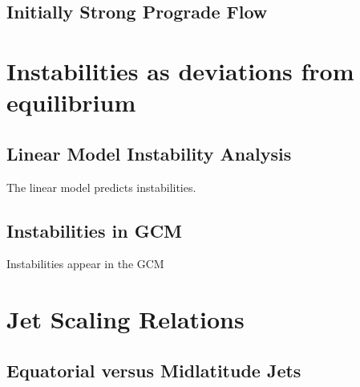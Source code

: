 \subsection*{Initially Strong Prograde Flow}





%
%
%
%
%
%
%



\section{Instabilities as deviations from equilibrium}

\subsection*{Linear Model Instability Analysis}

The linear model predicts instabilities.

\subsection*{Instabilities in GCM}

Instabilities appear in the GCM




\section{Jet Scaling Relations}

\subsection*{Equatorial versus Midlatitude Jets}











% 
% 
